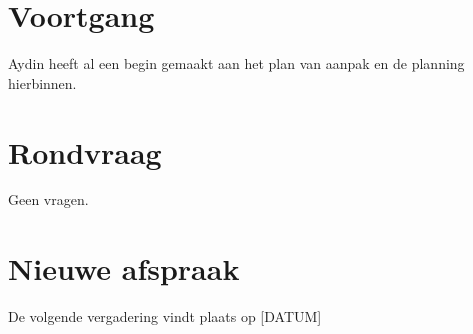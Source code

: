 \documentclass[dutch]{hu}
\begin{document}
\section{Voortgang}
Aydin heeft al een begin gemaakt aan het plan van aanpak en de planning hierbinnen.

\section{Rondvraag}
Geen vragen.

\section{Nieuwe afspraak}
De volgende vergadering vindt plaats op [DATUM]
\end{document}
